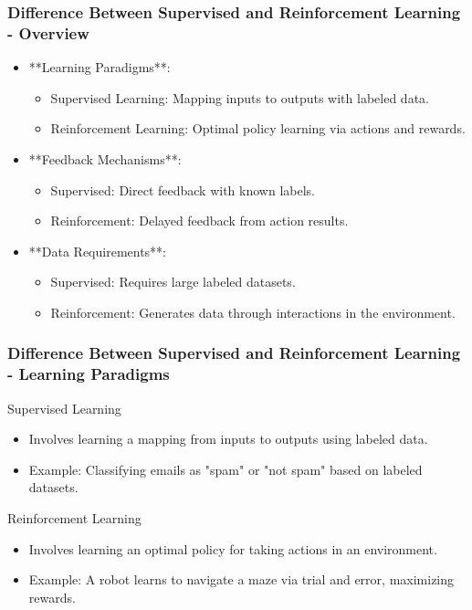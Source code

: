 \documentclass[aspectratio=169]{beamer}
\begin{document}
\begin{frame}[fragile]
    \frametitle{Difference Between Supervised and Reinforcement Learning - Overview}
    \begin{itemize}
        \item **Learning Paradigms**:
            \begin{itemize}
                \item Supervised Learning: Mapping inputs to outputs with labeled data.
                \item Reinforcement Learning: Optimal policy learning via actions and rewards.
            \end{itemize}
        \item **Feedback Mechanisms**:
            \begin{itemize}
                \item Supervised: Direct feedback with known labels.
                \item Reinforcement: Delayed feedback from action results.
            \end{itemize}
        \item **Data Requirements**:
            \begin{itemize}
                \item Supervised: Requires large labeled datasets.
                \item Reinforcement: Generates data through interactions in the environment.
            \end{itemize}
    \end{itemize}
\end{frame}

\begin{frame}[fragile]
    \frametitle{Difference Between Supervised and Reinforcement Learning - Learning Paradigms}
    \begin{block}{Supervised Learning}
        \begin{itemize}
            \item Involves learning a mapping from inputs to outputs using labeled data.
            \item Example: Classifying emails as "spam" or "not spam" based on labeled datasets.
        \end{itemize}
    \end{block}
    
    \begin{block}{Reinforcement Learning}
        \begin{itemize}
            \item Involves learning an optimal policy for taking actions in an environment.
            \item Example: A robot learns to navigate a maze via trial and error, maximizing rewards.
        \end{itemize}
    \end{block}
\end{frame}
\end{document}
